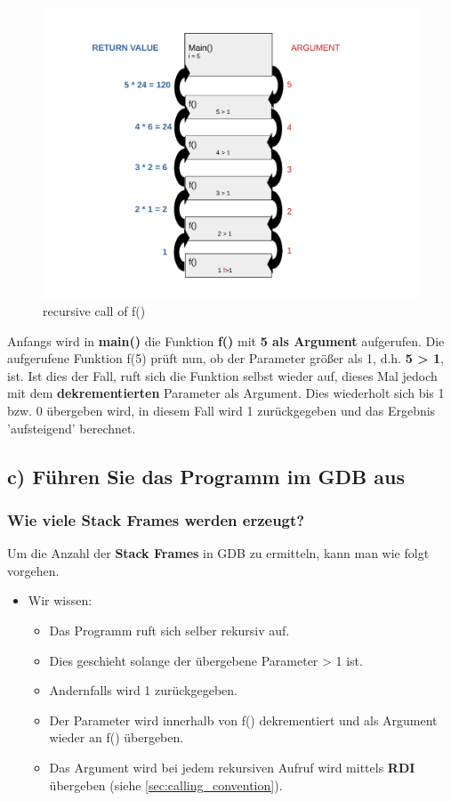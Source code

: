 \documentclass[12pt]{article}
\begin{document}
\begin{center}
\begin{figure}[h]
	\includegraphics[scale=0.6]{Pictures/aufgabe3aufrufe.pdf}
	\caption{recursive call of f()}
	\label{fig:recursive2}
\end{figure}
\end{center}

Anfangs wird in \textbf{main()} die Funktion \textbf{f()} mit \textbf{5 als Argument} aufgerufen. Die aufgerufene Funktion f(5) prüft nun, ob der Parameter größer als 1, d.h. \textbf{5 > 1}, ist. Ist dies der Fall, ruft sich die Funktion selbst wieder auf, dieses Mal jedoch mit dem \textbf{dekrementierten} Parameter als Argument. Dies wiederholt sich bis 1 bzw. 0 übergeben wird, in diesem Fall wird 1 zurückgegeben und das Ergebnis 'aufsteigend' berechnet.

\subsection{c) Führen Sie das Programm im GDB aus}




\subsubsection{Wie viele Stack Frames werden erzeugt?}
Um die Anzahl der \textbf{Stack Frames} in GDB zu ermitteln, kann man wie folgt vorgehen.
\begin{itemize}
	\item Wir wissen:
	\begin{itemize}
		\item Das Programm ruft sich selber rekursiv auf.
		\item Dies geschieht solange der übergebene Parameter > 1 ist.
		\item Andernfalls wird 1 zurückgegeben.
		\item Der Parameter wird innerhalb von f() dekrementiert und als Argument wieder an f() übergeben.
		\item Das Argument wird bei jedem rekursiven Aufruf wird mittels \textbf{RDI} übergeben (siehe \ref{sec:calling_convention}).
	\end{itemize}
\end{itemize}
\end{document}
